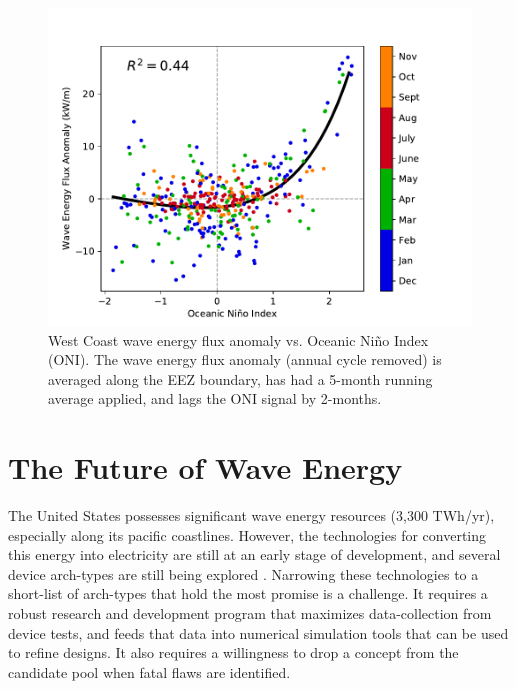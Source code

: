 \begin{figure}[ht]
  \centering
  \includegraphics[width=\textwidth]{../../fig/ENSO-Comparison.wc.pdf}
  \caption{West Coast wave energy flux anomaly vs. Oceanic Ni\~{n}o Index (ONI). The wave energy flux anomaly (annual cycle removed) is averaged along the EEZ boundary, has had a 5-month running average applied, and lags the ONI signal by 2-months.}
  \label{fig:wc-nino}
\end{figure}

\section{The Future of Wave Energy}
\label{sec:future}

The United States possesses significant wave energy resources (3,300 TWh/yr), especially along its pacific coastlines. However, the technologies for converting this energy into electricity are still at an early stage of development, and several device arch-types are still being explored \citep{babaritOceanWaveEnergy2017}. Narrowing these technologies to a short-list of arch-types that hold the most promise is a challenge. It requires a robust research and development program that maximizes data-collection from device tests, and feeds that data into numerical simulation tools that can be used to refine designs. It also requires a willingness to drop a concept from the candidate pool when fatal flaws are identified.

